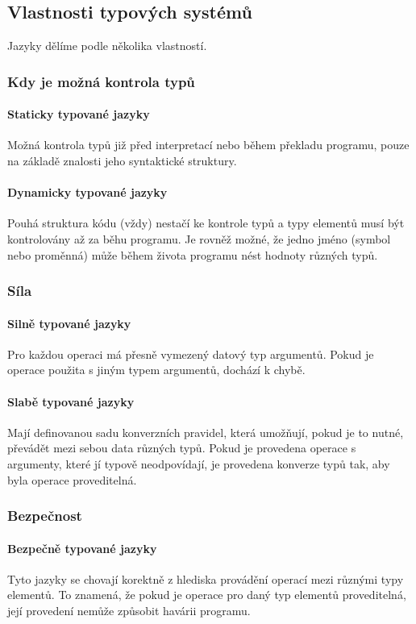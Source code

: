 \documentclass[10pt,a4paper]{article}
\begin{document}
  \subsection{Vlastnosti typových systémů}
    Jazyky dělíme podle několika vlastností.
    \subsubsection*{Kdy je možná kontrola typů}
      \paragraph{Staticky typované jazyky} 
        Možná kontrola typů již před interpretací nebo během překladu programu, pouze na základě znalosti jeho syntaktické struktury.
      \paragraph{Dynamicky typované jazyky}
        Pouhá struktura kódu (vždy) nestačí ke kontrole typů a typy elementů musí být kontrolovány až za běhu programu. Je rovněž možné, že jedno jméno (symbol nebo proměnná) může během života programu nést hodnoty různých typů.
    \subsubsection*{Síla}
      \paragraph{Silně typované jazyky}
        Pro každou operaci má přesně vymezený datový typ argumentů. Pokud je operace použita s jiným typem argumentů, dochází k chybě.
      \paragraph{Slabě typované jazyky}
        Mají definovanou sadu konverzních pravidel, která umožňují, pokud je to nutné, převádět mezi sebou data různých typů. Pokud je provedena operace s argumenty, které jí typově neodpovídají, je provedena konverze typů tak, aby byla operace proveditelná.
    \subsubsection*{Bezpečnost}
      \paragraph{Bezpečně typované jazyky}
        Tyto jazyky se chovají korektně z hlediska provádění operací mezi různými typy elementů. To znamená, že pokud je operace pro daný typ elementů proveditelná, její provedení nemůže způsobit havárii programu.
\end{document}
